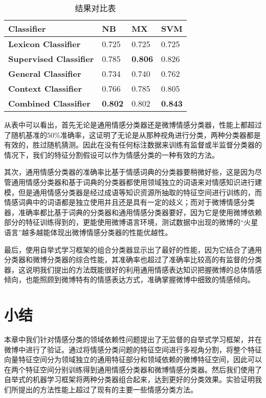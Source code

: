 \begin{table}[htp]
\caption{结果对比表}
\label{tab4-1}
\centering
\begin{tabular}{|l||l|l|l|}
\hline
\bfseries Classifier &  \bfseries NB    &   \bfseries MX    &   \bfseries SVM    \\
\hline

\bfseries Lexicon Classifier & 0.725 & 0.725 & 0.725 \\
\hline
\bfseries Supervised Classifier & 0.785 & \textbf{0.806} & 0.826 \\
\hline
\bfseries General Classifier & 0.734 &  0.740 & 0.762 \\
\hline
\bfseries Context Classifier & 0.766 & 0.785 & 0.805 \\
\hline
\bfseries Combined Classifier & \textbf{0.802} & 0.802 & \textbf{0.843} \\
\hline
\end{tabular}
\end{table}
从表中可以看出，首先无论是通用情感分类器还是微博情感分类器，性能上都超过了随机基准的50\%准确率，这证明了无论是从那种视角进行分类，两种分类器都是有效的，胜过随机猜测。因此在没有任何标注数据来训练有监督或半监督分类器的情况下，我们的特征分割假设可以作为情感分类的一种有效的方法。

其次，通用情感分类器的准确率比基于情感词典的分类器要稍微好些，这是因为尽管通用情感分类器和基于词典的分类器都使用领域独立的词语来对情感知识进行建模，但是通用情感分类器是经过成语等知识资源所抽取的特征空间进行训练的，而情感词典中的词语都是独立使用并且还是具有一定的歧义；而对于微博情感分类器，准确率都比基于词典的分类器和通用情感分类器要好，因为它是使用微博依赖部分的特征训练得到的，更能使用微博语言环境，测试数据中出现的微博的“火星语言”越多越能体现出微博情感分类器的性能优越性。

最后，使用自举式学习框架的组合分类器显示出了最好的性能，因为它结合了通用分类器和微博分类器的综合性能，其准确率也超过了准确率比较高的有监督的分类器，这说明我们提出的方法既能很好的利用通用情感表达知识把握微博的总体情感倾向，也能照顾到微博特有的情感表达方式，准确掌握微博中细致的情感倾向。

\section{小结}
\label{conclusion}
本章中我们针对情感分类的领域依赖性问题提出了无监督的自举式学习框架，并在微博中进行了验证。通过将情感分类问题的特征空间进行多视角分割，将整个特征向量特征空间分为领域独立的通用特征部分和领域依赖的微博特征空间，因此可以在两个特征空间分别训练得到通用情感分类器和微博情感分类器。然后我们使用了自举式的机器学习框架将两种分类器组合起来，达到更好的分类效果。实验证明我们所提出的方法性能上超过了现有的主要一些情感分类方法。
